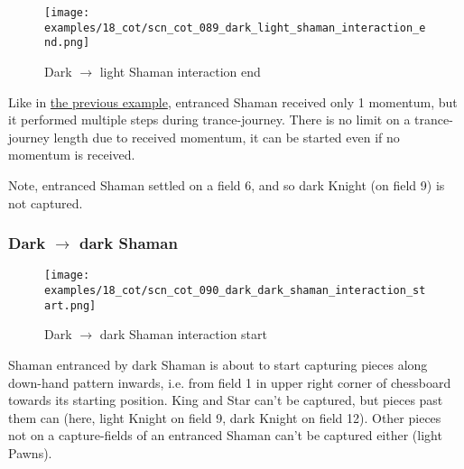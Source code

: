\noindent
\begin{figure}[!h]
\texttt{[image: examples/18\_cot/scn\_cot\_089\_dark\_light\_shaman\_interaction\_end.png]}
\caption{Dark $\rightarrow$ light Shaman interaction end}
\label{fig:scn_cot_089_dark_light_shaman_interaction_end}
\end{figure}

Like in
\hyperref[fig:scn_cot_086_light_light_shaman_interaction_start]{the previous example},
entranced Shaman received only 1 momentum, but it performed multiple steps during
trance-journey. There is no limit on a trance-journey length due to received momentum,
it can be started even if no momentum is received.

Note, entranced Shaman settled on a field 6, and so dark Knight (on field 9) is not
captured.

\clearpage %

\subsubsection*{Dark $\rightarrow$ dark Shaman}
\label{sec:Conquest of Tlalocan/Trance-journey/Interactions/Dark --> dark Shaman}

\vspace*{-1.5\baselineskip}
\noindent
\begin{figure}[!h]
\texttt{[image: examples/18\_cot/scn\_cot\_090\_dark\_dark\_shaman\_interaction\_start.png]}
\vspace*{-1.4\baselineskip}
\caption{Dark $\rightarrow$ dark Shaman interaction start}
\label{fig:scn_cot_090_dark_dark_shaman_interaction_start}
\end{figure}

\vspace*{-0.5\baselineskip}
Shaman entranced by dark Shaman is about to start capturing pieces along down-hand
pattern inwards, i.e. from field 1 in upper right corner of chessboard towards its
starting position.\newline
\indent
King and Star can't be captured, but pieces past them can (here, light Knight on
field 9, dark Knight on field 12). Other pieces not on a capture-fields of an
entranced Shaman can't be captured either (light Pawns).

